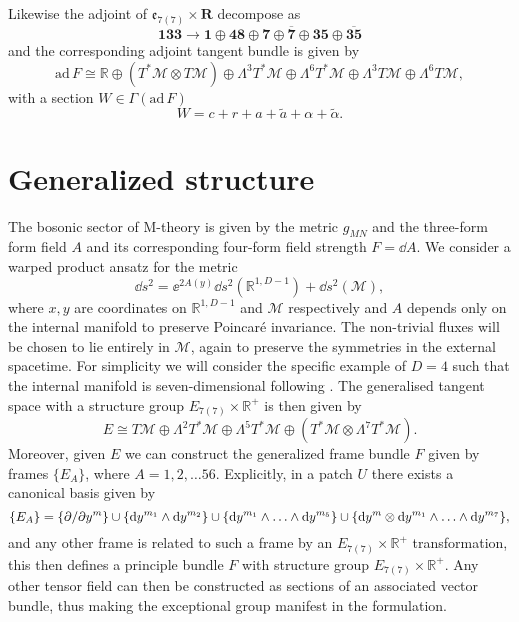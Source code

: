 Likewise the adjoint of $\mathfrak{e}_{7(7)}\times\mathbf{R}$ decompose as
\begin{equation}
    \mathbf{133}\to \mathbf{1}\oplus\mathbf{48}\oplus\mathbf{7}\oplus\overbar{\mathbf{7}}\oplus\mathbf{35}\oplus\overbar{\mathbf{35}}
\end{equation}
and the corresponding adjoint tangent bundle is given by
\begin{equation}
    \text{ad}\, F \cong \mathbb{R}\oplus \left(T^*\mathcal{M}\otimes T\mathcal{M}\right)\oplus \Lambda^3 T^*\mathcal{M}\oplus\Lambda^6 T^*\mathcal{M}\oplus\Lambda^3 T\mathcal{M}\oplus\Lambda^6 T\mathcal{M},
\end{equation}
with a section $W\in\Gamma(\text{ad}\,F)$
\begin{equation}
    W = c+r+a+\tilde{a}+\alpha+\tilde{\alpha}.
\end{equation}


\section{Generalized structure\label{sec:Generalised structures}}
The bosonic sector of M-theory is given by the metric $g_{MN}$ and the three-form form field $A$ and its corresponding four-form field strength $F=\dd A$. We consider a warped product ansatz for the metric 
\begin{equation}
    \dd s^2 = \ee^{2A(y)}\dd s^2(\mathbb{R}^{1,D-1})+\dd s^2(\mathcal{M}),
\end{equation}
where $x,y$ are coordinates on $\mathbb{R}^{1,D-1}$ and $\mathcal{M}$ respectively and $A$ depends only on the internal manifold to preserve Poincaré invariance. The non-trivial fluxes will be chosen to lie entirely in $\mathcal{M}$, again to preserve the symmetries in the external spacetime. For simplicity we will consider the specific example of $D=4$ such that the internal manifold is seven-dimensional following \cite{Ashmore:2015joa}. The generalised tangent space with a structure group $E_{7(7)}\times\mathbb{R}^+$ is then given by 
\begin{equation}
    E \cong T\mathcal{M}\oplus\Lambda^2T^*\mathcal{M}\oplus\Lambda^5T^*\mathcal{M}\oplus\left(T^*\mathcal{M}\otimes\Lambda^7 T^*\mathcal{M}\right).
\end{equation}
Moreover, given $E$ we can construct the generalized frame bundle $F$ given by frames $\{E_A\}$, where $A=1,2,\ldots 56$. Explicitly, in a patch $U$ there exists a canonical basis given by 
\begin{equation}
    \{E_A\} = \{\partial/\partial y^m\}\cup \{\mathrm{d} y^{m_1}\wedge\mathrm{d} y^{m_2}\}\cup\{\mathrm{d} y^{m_1}\wedge\ldots\wedge\mathrm{d} y^{m_5}\}\cup \{\mathrm{d} y^m\otimes\mathrm{d} y^{m_1}\wedge\ldots\wedge\mathrm{d} y^{m_7}\},
\end{equation}
and any other frame is related to such a frame by an $E_{7(7)}\times \mathbb{R}^+$ transformation, this then defines a principle bundle $F$ with structure group $E_{7(7)}\times \mathbb{R}^+$. Any other tensor field can then be constructed as sections of an associated vector bundle, thus making the exceptional group manifest in the formulation. 


